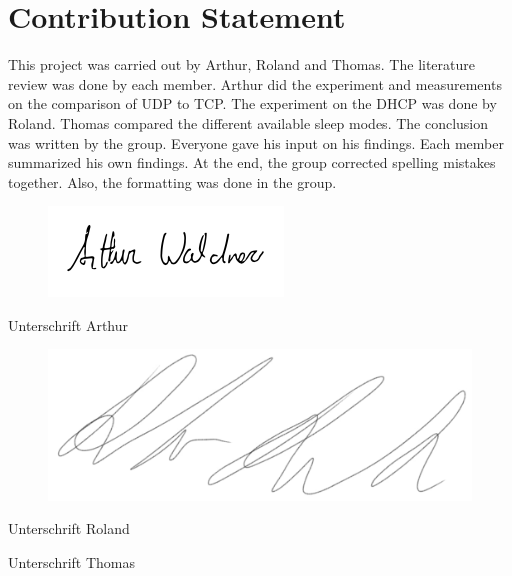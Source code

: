 \chapter*{Contribution Statement}
This project was carried out by Arthur, Roland and Thomas. The literature review was done by each member.
Arthur did the experiment and measurements on the comparison of UDP to TCP.
The experiment on the DHCP was done by Roland.
Thomas compared the different available sleep modes.
The conclusion was written by the group. Everyone gave his input on his findings.
Each member summarized his own findings. At the end, the group corrected spelling mistakes together. Also, the formatting was done in the group.

\vspace{2cm}

\begin{minipage}[t]{0.3\textwidth}
    \begin{figure}[H]
        \centering
        \includegraphics[width = 1 \linewidth]{./sign_arthur.png}
    \end{figure}
    Unterschrift Arthur
\end{minipage}
\begin{minipage}[t]{0.3\textwidth}
    \begin{figure}[H]
        \centering
        \includegraphics[width = 1 \linewidth]{./sign_roland.png}
        \label{fig:sign_roland}
    \end{figure}
    Unterschrift Roland
\end{minipage}
\begin{minipage}[t]{0.3\textwidth}
    Unterschrift Thomas
\end{minipage}